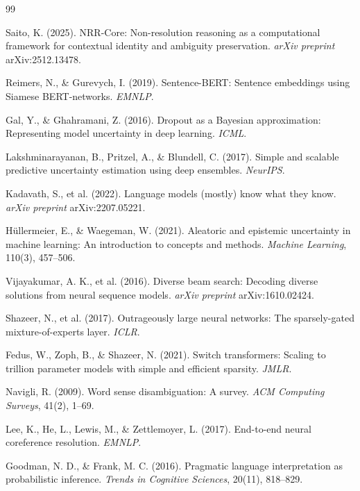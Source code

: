 \documentclass[11pt,a4paper]{article}
\begin{document}
\begin{thebibliography}{99}

Saito, K. (2025).
NRR-Core: Non-resolution reasoning as a computational framework for contextual identity and ambiguity preservation.
\textit{arXiv preprint} arXiv:2512.13478.

Reimers, N., \& Gurevych, I. (2019).
Sentence-BERT: Sentence embeddings using Siamese BERT-networks.
\textit{EMNLP}.

Gal, Y., \& Ghahramani, Z. (2016).
Dropout as a Bayesian approximation: Representing model uncertainty in deep learning.
\textit{ICML}.

Lakshminarayanan, B., Pritzel, A., \& Blundell, C. (2017).
Simple and scalable predictive uncertainty estimation using deep ensembles.
\textit{NeurIPS}.

Kadavath, S., et al. (2022).
Language models (mostly) know what they know.
\textit{arXiv preprint} arXiv:2207.05221.

H{\"u}llermeier, E., \& Waegeman, W. (2021).
Aleatoric and epistemic uncertainty in machine learning: An introduction to concepts and methods.
\textit{Machine Learning}, 110(3), 457--506.

Vijayakumar, A. K., et al. (2016).
Diverse beam search: Decoding diverse solutions from neural sequence models.
\textit{arXiv preprint} arXiv:1610.02424.

Shazeer, N., et al. (2017).
Outrageously large neural networks: The sparsely-gated mixture-of-experts layer.
\textit{ICLR}.

Fedus, W., Zoph, B., \& Shazeer, N. (2021).
Switch transformers: Scaling to trillion parameter models with simple and efficient sparsity.
\textit{JMLR}.

Navigli, R. (2009).
Word sense disambiguation: A survey.
\textit{ACM Computing Surveys}, 41(2), 1--69.

Lee, K., He, L., Lewis, M., \& Zettlemoyer, L. (2017).
End-to-end neural coreference resolution.
\textit{EMNLP}.

Goodman, N. D., \& Frank, M. C. (2016).
Pragmatic language interpretation as probabilistic inference.
\textit{Trends in Cognitive Sciences}, 20(11), 818--829.

\end{thebibliography}
\end{document}
